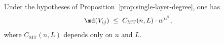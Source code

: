 
\begin{proposition}\label{prop:single-layer-mt}
Under the hypotheses of Proposition~\ref{prop:single-layer-degree}, one has
\begin{equation*}
  \md(V_{ij}) \;\leq\; C_{\mathrm{MT}}(n,L)\cdot w^{n^2},
\end{equation*}
where $C_{\mathrm{MT}}(n,L)$ depends only on $n$ and $L$.
\end{proposition}

